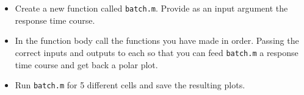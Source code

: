 \documentclass[paper=a4, fontsize=11pt]{scrartcl} %
\numberwithin{equation}{section} %
\numberwithin{figure}{section} %
\numberwithin{table}{section} %
\begin{document}
\begin{itemize}
\setlength{\parskip}{0.25em}
\item Create a new function called \texttt{batch.m}. Provide as an input argument the response time course. 
\item In the function body call the functions you have made in order. Passing the correct inputs and outputs to each so that 
you can feed \texttt{batch.m} a response time course and get back a polar plot. 
\item Run \texttt{batch.m} for 5 different cells and save the resulting plots. 
\end{itemize}
\end{document}
